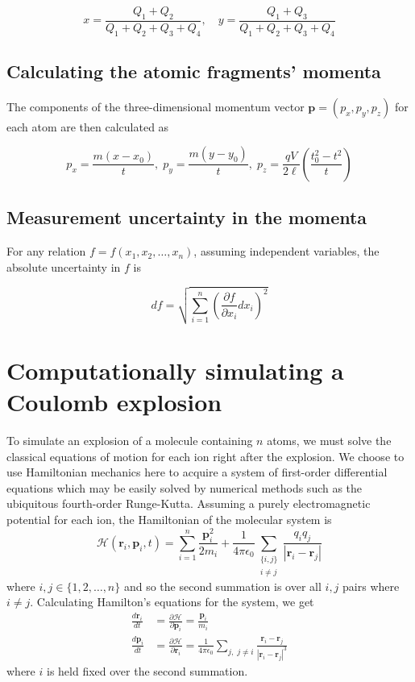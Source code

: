 \begin{equation}
x = \frac{Q_1 + Q_2}{Q_1 + Q_2 + Q_3 + Q_4} ,\quad
y = \frac{Q_1 + Q_3}{Q_1 + Q_2 + Q_3 + Q_4}
\end{equation}

\subsection{Calculating the atomic fragments' momenta}
The components of the three-dimensional momentum vector $\mathbf{p} = (p_x,p_y,p_z)$ for each atom are then calculated as

\begin{equation}
p_x = \frac{m(x-x_0)}{t} ,\;
p_y = \frac{m(y-y_0)}{t} ,\;
p_z = \frac{qV}{2\ell} \left( \frac{t_0^2 - t^2}{t} \right)
\end{equation}

\subsection{Measurement uncertainty in the momenta}
For any relation $f = f(x_1, x_2, \dots, x_n)$, assuming independent variables, the absolute uncertainty in $f$ is

\begin{equation}
df = \sqrt{\sum_{i=1}^{n} \left( \frac{\partial f}{\partial x_i} dx_i \right)^2}
\end{equation}

\section{Computationally simulating a Coulomb explosion}
To simulate an explosion of a molecule containing $n$ atoms, we must solve the classical equations of motion for each ion right after the explosion. We choose to use Hamiltonian mechanics here to acquire a system of first-order differential equations which may be easily solved by numerical methods such as the ubiquitous fourth-order Runge-Kutta. Assuming a purely electromagnetic potential for each ion, the Hamiltonian of the molecular system is
\begin{equation}
\mathcal{H}(\mathbf{r}_i, \mathbf{p}_i, t) = \sum_{i=1}^n \frac{\mathbf{p}_i^2}{2m_i} + \frac{1}{4\pi\epsilon_0}\sum_{\substack{\lbrace i,j\rbrace\\ i \ne j}} \frac{q_iq_j}{|\mathbf{r}_i-\mathbf{r}_j|}
\end{equation}
where $i,j \in \lbrace 1,2,\dots, n \rbrace$ and so the second summation is over all $i,j$ pairs where $i \ne j$. Calculating Hamilton's equations for the system, we get
\begin{subequations}
  \begin{align}
  \frac{d\mathbf{r}_i}{dt} &= \frac{\partial \mathcal{H}}{\partial \mathbf{p}_i} = \frac{\mathbf{p}_i}{m_i} \\
  \frac{d\mathbf{p}_i}{dt} &= \frac{\partial \mathcal{H}}{\partial \mathbf{r}_i} = \frac{1}{4\pi\epsilon_0}\sum_{j, \; j \ne i} \frac{\mathbf{r}_i - \mathbf{r}_j}{|\mathbf{r}_i - \mathbf{r}_j|^3}
  \end{align}
\end{subequations}
where $i$ is held fixed over the second summation.
